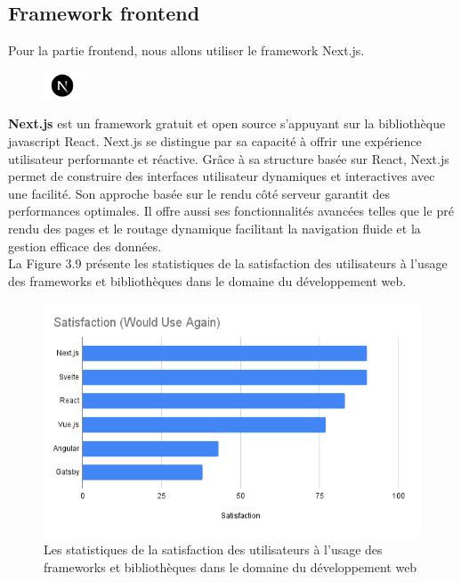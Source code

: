 \subsection{Framework frontend}
\noindent Pour la partie frontend, nous allons utiliser le framework Next.js.
\vspace{0.5em}
\begin{figure}
    \vspace{-15pt}
    \includegraphics[width=0.1\textwidth]{images/chp5/nextjs.png}
\end{figure}
\textbf{Next.js} est un framework gratuit et open source s'appuyant sur la bibliothèque javascript React. Next.js se distingue par sa capacité à offrir une expérience utilisateur performante et réactive. Grâce à sa structure basée sur React, Next.js permet de construire des interfaces utilisateur dynamiques et interactives avec une facilité. Son approche basée sur le rendu côté serveur garantit des performances optimales. Il offre aussi ses fonctionnalités avancées telles que le pré rendu des pages et le routage dynamique facilitant la navigation fluide et la gestion efficace des données.\\
La Figure 3.9 présente les statistiques de la satisfaction des utilisateurs à l’usage des frameworks et bibliothèques dans le domaine du développement web.
    \begin{figure}[H]
        \centering
        \includegraphics[width=1\textwidth,height=0.4\textheight]{images/chp3/fig9.png}
        \caption{Les statistiques de la satisfaction des utilisateurs à l’usage des frameworks et bibliothèques dans le domaine du développement web \cite{StatsFramework}}        
        \label{fig:Les statistiques de la satisfaction des utilisateurs à l’usage des frameworks et bibliothèques dans le domaine du développement web}    
    \end{figure}

